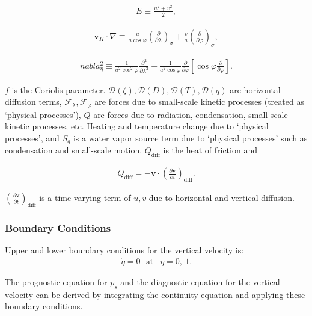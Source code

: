 \begin{eqnarray}
E  \equiv \frac{u^{2}+v^{2}}{2},
\end{eqnarray}

\begin{eqnarray}
  {\mathbf{v}}_{H} \cdot \nabla
  \equiv \frac{u}{a \cos \varphi}
  \left( \frac{\partial }{\partial \lambda} \right)_{\sigma}
    + \frac{v}{a}
  \left( \frac{\partial }{\partial \varphi} \right)_{\sigma},
\end{eqnarray}

\begin{eqnarray}
  nabla^{2}_{\eta}
  \equiv
  \frac{1}{a^{2}\cos^2\varphi}
  \frac{\partial^{2} }{\partial \lambda^{2}}
    + \frac{1}{a^{2}\cos\varphi}
  \frac{\partial }{\partial \varphi}
  \left[ \cos\varphi
  \frac{\partial }{\partial \varphi} \right].
\end{eqnarray}

\(f\) is the Coriolis parameter. \({\mathcal D}(\zeta), {\mathcal D}(D), {\mathcal D}(T), {\mathcal D}(q)\) are horizontal diffusion terms, \({\mathcal F}_\lambda, {\mathcal F}_\varphi\) are forces
due to small-scale kinetic processes (treated as `physical processes'), \(Q\) are forces due to radiation, condensation, small-scale kinetic processes, etc. Heating and temperature change due to
`physical processes', and \(S_q\) is a water vapor source term due to `physical processes' such as condensation and small-scale motion. \(Q_{\mathrm{diff}}\) is the heat of friction and

\begin{eqnarray}
Q_{\mathrm{diff}}
= - {\mathbf{v}} \cdot  \left( \frac{\partial {\mathbf{v}}}{\partial t} \right)_{\mathrm{diff}} .
\end{eqnarray}

\(( \frac{\partial {\mathbf{v}}}{\partial t} )_{\mathrm{diff}}\) is a time-varying term of \(u,v\) due to horizontal and vertical diffusion.

\hypertarget{boundary-conditions}{%
\subsubsection{Boundary Conditions}\label{boundary-conditions}}

Upper and lower boundary conditions for the vertical velocity is: \begin{eqnarray}
\dot{\eta} = 0  \ \ \ \text{at~} \ \ \eta = 0 , \ 1 .
\end{eqnarray}

The prognostic equation for \(p_s\) and the diagnostic equation for the vertical velocity can be derived by integrating the continuity equation and applying these boundary conditions.
